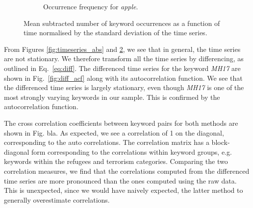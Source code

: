 \documentclass[12pt, a4paper]{article}
\begin{document}
\begin{figure}
\begin{subfigure}{.5\textwidth}
  \caption{Occurrence frequency for \textit{apple}.}
  \label{fig:sub23}
\end{subfigure}
\caption{Mean subtracted number of keyword occurrences as a function of time normalised by the standard deviation of the time series.}
\label{fig:timeseries_rel}
\end{figure}

From Figures \ref{fig:timeseries_abs} and \ref{fig:timeseries_rel}, we see that in general, the time series are not stationary. We therefore transform all the time series by differencing, as outlined in Eq.~\ref{eq:diff}. The differenced time series for the keyword \textit{MH17} are shown in Fig.~\ref{fig:diff_acf} along with its autocorrelation function. We see that the differenced time series is largely stationary, even though \textit{MH17} is one of the most strongly varying keywords in our sample. This is confirmed by the autocorrelation function.

The cross correlation coefficients between keyword pairs for both methods are shown in Fig. bla. As expected, we see a correlation of 1 on the diagonal, corresponding to the auto correlations. The correlation matrix has a block-diagonal form corresponding to the correlations within keyword groups, e.g. keywords within the refugees and terrorism categories. Comparing the two correlation measures, we find that the correlations computed from the differenced time series are more pronounced than the ones computed using the raw data. This is unexpected, since we would have naively expected, the latter method to generally overestimate correlations. 
\end{document}

